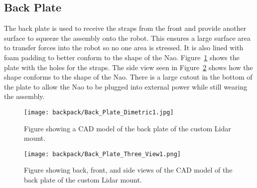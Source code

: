 \FloatBarrier

\subsection{Back Plate}
The back plate is used to receive the straps from the front and provide another
surface to squeeze the assembly onto the robot. This ensures a large surface
area to transfer forces into the robot so no one area is stressed. It is also
lined with foam padding to better conform to the shape of the Nao.
Figure~\ref{fig:nao_lidar_mount_backplate_dimetric1} shows the plate with the
holes for the straps.
The side view seen in Figure~\ref{fig:nao_lidar_mount_backplate_three_view1}
shows how the shape conforms to the shape of the Nao. There is a large
cutout in the bottom of the plate to allow the Nao to be plugged into external
power while still wearing the assembly.

\begin{figure}[H]
\centering
\texttt{[image: backpack/Back\_Plate\_Dimetric1.jpg]}
\caption{Figure showing a CAD model of the back plate of the custom
         Lidar mount.}
\label{fig:nao_lidar_mount_backplate_dimetric1}
\end{figure}

\begin{figure}[H]
\centering
\texttt{[image: backpack/Back\_Plate\_Three\_View1.png]}
\caption{Figure showing back, front, and side views of the CAD model of the
         back plate of the custom Lidar mount.}
\label{fig:nao_lidar_mount_backplate_three_view1}
\end{figure}


